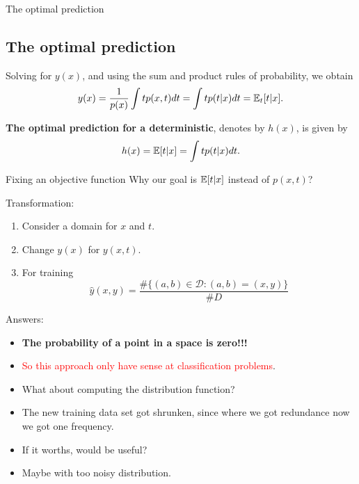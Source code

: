   \begin{frame}{The optimal prediction}
    \subsection{The optimal prediction}
    Solving for $y(x)$, and using the sum and product rules of probability, we obtain
    \begin{equation}
        y(x)
        = 
        \frac{1}{p(x)} 
        \int t p(x,t) dt
        = 
        \int t p(t|x) dt
        = \mathbb{E}_t[t|x].
    \end{equation}

    
    \textbf{The optimal prediction for a deterministic}, denotes by $h(x)$, is given by 
    \begin{equation}
      h(x) = \mathbb{E} [t|x] = \int t p(t|x) dt.
    \end{equation}
  \end{frame}

  \begin{frame}{Fixing an objective function}
  Why our goal is $\mathbb{E} [t|x]$ instead of $p(x,t)$?
   
  Transformation: 
  \begin{enumerate}
    \item Consider a domain for $x$ and $t$.
    \item Change $y(x)$ for $y(x,t)$.
    \item For training 
    \begin{equation}
        \hat y (x,y) = \frac{\#\{(a,b) \in \mathcal{D} : (a,b) = (x,y)\}}{ \#D}
    \end{equation}
  \end{enumerate}

  Answers:  
  \begin{itemize}
    \item \textbf{The probability of a point in a space is zero!!!}
    \item \textcolor{red}{So this approach only have sense at classification problems}. 
    \item What about computing the distribution function?
    \item The new training data set got shrunken, 
    since where we got redundance now we got one frequency.
    \item If it worths, would be useful?
    \item Maybe with too noisy distribution.
  \end{itemize}
  
  \end{frame}

